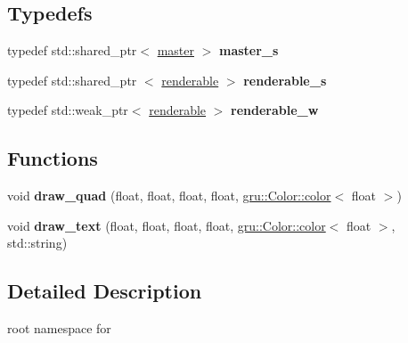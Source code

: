 \subsection*{\-Typedefs}
\begin{DoxyCompactItemize}
\item 
\hypertarget{namespaceglutpp_ad416fff92cdabdc3141618680ccd1945}{typedef std\-::shared\-\_\-ptr$<$ \hyperlink{classglutpp_1_1master}{master} $>$ {\bfseries master\-\_\-s}}\label{namespaceglutpp_ad416fff92cdabdc3141618680ccd1945}

\item 
\hypertarget{namespaceglutpp_a67ccde707354c95f87efe65589d3219d}{typedef std\-::shared\-\_\-ptr\*
$<$ \hyperlink{classglutpp_1_1renderable}{renderable} $>$ {\bfseries renderable\-\_\-s}}\label{namespaceglutpp_a67ccde707354c95f87efe65589d3219d}

\item 
\hypertarget{namespaceglutpp_ab992d93431ecb78e57041c940827dd90}{typedef std\-::weak\-\_\-ptr$<$ \hyperlink{classglutpp_1_1renderable}{renderable} $>$ {\bfseries renderable\-\_\-w}}\label{namespaceglutpp_ab992d93431ecb78e57041c940827dd90}

\end{DoxyCompactItemize}
\subsection*{\-Functions}
\begin{DoxyCompactItemize}
\item 
\hypertarget{namespaceglutpp_ac10fd6d0440b8fc5e29807ff197d833e}{void {\bfseries draw\-\_\-quad} (float, float, float, float, \hyperlink{classgru_1_1Color_1_1color}{gru\-::\-Color\-::color}$<$ float $>$)}\label{namespaceglutpp_ac10fd6d0440b8fc5e29807ff197d833e}

\item 
\hypertarget{namespaceglutpp_ad8dfef9148bfe7dea03f6866adb54941}{void {\bfseries draw\-\_\-text} (float, float, float, float, \hyperlink{classgru_1_1Color_1_1color}{gru\-::\-Color\-::color}$<$ float $>$, std\-::string)}\label{namespaceglutpp_ad8dfef9148bfe7dea03f6866adb54941}

\end{DoxyCompactItemize}


\subsection{\-Detailed \-Description}
root namespace for  